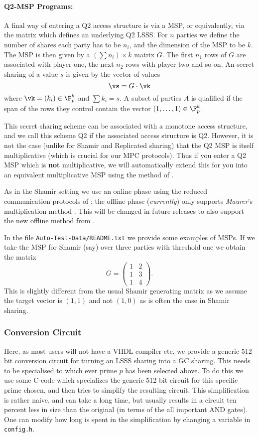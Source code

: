 \paragraph{Q2-MSP Programs:}
A final way of entering a Q2 access structure is via a MSP, or equivalently,
via the matrix which defines an underlying Q2 LSSS.
For $n$ parties we define the number of shares each party has to be 
$n_i$, and the dimension of the MSP to be $k$. The MSP is then given
by a $(\sum n_i) \times k$ matrix $G$.
The first $n_1$ rows of $G$ are associated with player one, the
next $n_2$ rows with player two and so on.
An secret sharing of a value $s$ is given by the vector of values
\[ \vs = G \cdot \vk \]
where $\vk = (k_i) \in \F_p^k$ and $\sum k_i =s$.
A subset of parties $A$ is qualified if the span of the rows they control
contain the vector $(1,\ldots,1) \in \F_p^k$.

This secret sharing scheme can be associated with a monotone
access structure, and we call this scheme Q2 if the associated
access structure is Q2.
However, it is not the case (unlike for Shamir and Replicated sharing)
that the Q2 MSP is itself multiplicative (which is crucial for
our MPC protocols).
Thus if you enter a Q2 MSP which is {\bf not} multiplicative, we
will automatically extend this for you into an equivalent multiplicative MSP
using the method of \cite{CDM00}.

As in the Shamir setting we use an online phase using the reduced communication
protocols of \cite{KRSW}; 
the offline phase ({\em currently}) only supports {\em Maurer}'s multiplication method
\cite{Maurer}.
This will be changed in future releases to also support the new offline method from
\cite{SW18}.

In the file \verb+Auto-Test-Data/README.txt+ we provide some examples
of MSPs. If we take the MSP for Shamir (say) over three parties with threshold
one we obtain the matrix
\[ 
   G = \left( \begin{array}{cc}
      1 & 2 \\ 1 & 3 \\ 1 & 4 
       \end{array} \right).
\]
This is slightly different from the usual Shamir generating matrix
as we assume the target vector is $(1,1)$ and not $(1,0)$ as is often
the case in Shamir sharing.


\subsubsection{Conversion Circuit}
Here, as most users will not have a VHDL compiler etc, we provide
a generic 512 bit conversion circuit for turning an LSSS sharing
into a GC sharing.
This needs to be specialised to which ever prime $p$ has been selected above.
To do this we use some C-code  which specializes the generic 512
bit circuit for this specific prime chosen, and then tries
to simplify the resulting circuit. This simplification is rather
naive, and can take a long time, but usually results in a circuit ten percent
less in size than the original (in terms of the all important AND gates).
One can modify how long is spent in the simplification by 
changing a variable in \verb+config.h+.

